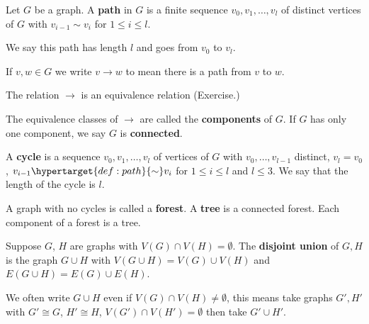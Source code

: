 \documentclass{article}
\begin{document}
\begin{defi}
    Let $G$ be a graph. A \textbf{path} in $G$ is a finite sequence $v_0, v_1, \dotsc, v_l$ of distinct vertices of $G$ with $v_{i-1} \sim v_i$ for $1 \leq i \leq l$.


    We say this path has length $l$ and goes from $v_0$ to $v_l$.

    If $v, w \in G$ we write $v \to w$ to mean there is a path from $v$ to $w$.
\end{defi}

The relation $\to$ is an equivalence relation (Exercise.) %

\begin{defi}
    The equivalence classes of $\to$ are called the \textbf{components} of $G$. If $G$ has only one component, we say $G$ is \textbf{connected}.
\end{defi}

\begin{defi}
    A \textbf{cycle} is a sequence $v_0, v_1, \dotsc, v_l$ of vertices of $G$ with $v_0, \dots, v_{l-1}$ distinct, $v_l = v_0$, $v_{i-1} \hypertarget{def:path}{\sim} v_i$ for $1 \leq i \leq l$ and $l \leq 3$.
    We say that the length of the cycle is $l$.
\end{defi}

\begin{defi}
    A graph with no cycles is called a \textbf{forest}.  A \textbf{tree} is a connected forest. Each component of a forest is a tree.
\end{defi}

\begin{defi}
    Suppose $G$, $H$ are graphs with $V(G) \cap V(H) = \emptyset$. The \textbf{disjoint union} of $G, H$ is the graph $G \cup H$ with $V(G \cup H) = V(G) \cup V(H)$ and $E(G \cup H) = E(G) \cup E(H)$.

    We often write $G \cup H$ even if $V(G) \cap V(H) \neq \emptyset$, this means take graphs $G', H'$ with $G' \cong G$, $H' \cong H$, $V(G') \cap V(H') = \emptyset$ then take $G' \cup H'$.
\end{defi}
\end{document}
